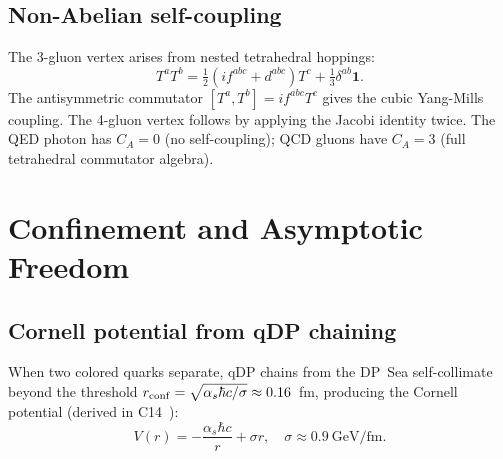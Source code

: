\documentclass[11pt,a4paper]{article}
\newcommand{\as}{\alpha_s}
\begin{document}
\subsection{Non-Abelian self-coupling}

The 3-gluon vertex arises from nested tetrahedral hoppings:
\begin{equation}
T^aT^b = \tfrac{1}{2}(if^{abc}+d^{abc})T^c + \tfrac{1}{3}\delta^{ab}\mathbf{1}.
\label{eq:TaTb}
\end{equation}
The antisymmetric commutator $[T^a,T^b] = if^{abc}T^c$ gives the
cubic Yang-Mills coupling.  The 4-gluon vertex follows by applying
the Jacobi identity twice.  The QED photon has $C_A = 0$ (no
self-coupling); QCD gluons have $C_A = 3$ (full tetrahedral
commutator algebra).

\section{Confinement and Asymptotic Freedom}
\label{sec:confinement}

\subsection{Cornell potential from qDP chaining}

When two colored quarks separate, qDP chains from the DP~Sea
self-collimate beyond the threshold $r_{\rm conf} =
\sqrt{\as\hbar c/\sigma} \approx 0.16$~fm, producing the Cornell
potential (derived in C14~\citep{c14}):
\begin{equation}
V(r) = -\frac{\as\hbar c}{r} + \sigma r,\quad
\sigma \approx 0.9\ \text{GeV/fm}.
\label{eq:cornell}
\end{equation}
\end{document}

